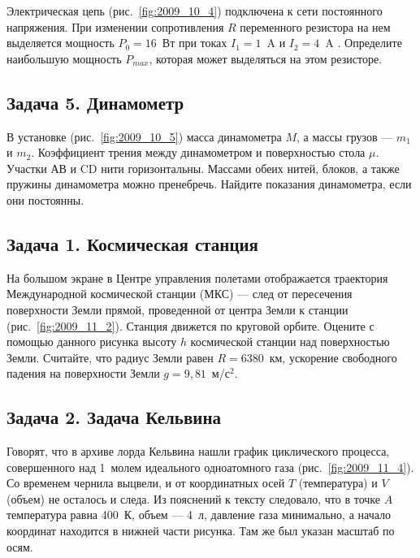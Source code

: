 Электрическая цепь (рис.~\ref{fig:2009_10_4}) подключена к сети
постоянного напряжения. При изменении сопротивления $R$ переменного
резистора на нем выделяется мощность $P_0 = 16$~Вт при токах
$I_1 = 1$~A и $I_2 = 4$~A . Определите наибольшую мощность $P_{max}$,
которая может выделяться на этом резисторе.

\subsection*{Задача 5. Динамометр}

В установке (рис.~\ref{fig:2009_10_5}) масса динамометра $M$, а массы
грузов --- $m_1$ и $m_2$. Коэффициент трения между динамометром и
поверхностью стола $\mu$. Участки АВ и CD нити горизонтальны. Массами
обеих нитей, блоков, а также пружины динамометра можно
пренебречь. Найдите показания динамометра, если они постоянны.

\clearpage


\subsection*{Задача 1. Космическая станция}

На большом экране в Центре управления полетами отображается траектория
Международной космической станции (МКС) --- след от пересечения
поверхности Земли прямой, проведенной от центра Земли к станции
(рис.~\ref{fig:2009_11_2}). Станция движется по круговой
орбите. Оцените с помощью данного рисунка высоту $h$ космической
станции над поверхностью Земли. Считайте, что радиус Земли равен
$R = 6380$~км, ускорение свободного падения на поверхности Земли
$g = 9{,}81$~м/с$^2$.



\subsection*{Задача 2. Задача Кельвина}

Говорят, что в архиве лорда Кельвина нашли график циклического
процесса, совершенного над 1~молем идеального одноатомного газа
(рис.~\ref{fig:2009_11_4}). Со временем чернила выцвели, и от
координатных осей $T$ (температура) и $V$ (объем) не осталось и
следа. Из пояснений к тексту следовало, что в точке $A$ температура
равна 400~К, объем --- 4~л, давление газа минимально, а начало
координат находится в нижней части рисунка. Там же был указан масштаб
по осям.

